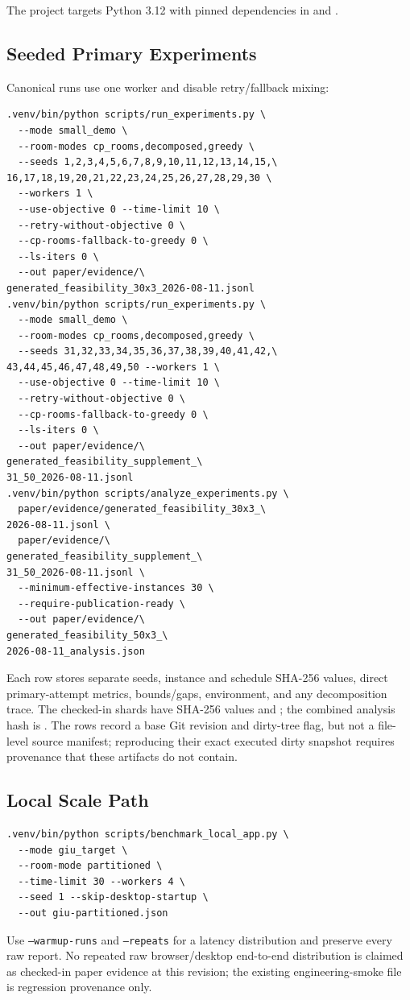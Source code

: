 The project targets Python 3.12 with pinned dependencies in  and .

\subsection*{Seeded Primary Experiments}
Canonical runs use one worker and disable retry/fallback mixing:
\begingroup\scriptsize
\begin{verbatim}
.venv/bin/python scripts/run_experiments.py \
  --mode small_demo \
  --room-modes cp_rooms,decomposed,greedy \
  --seeds 1,2,3,4,5,6,7,8,9,10,11,12,13,14,15,\
16,17,18,19,20,21,22,23,24,25,26,27,28,29,30 \
  --workers 1 \
  --use-objective 0 --time-limit 10 \
  --retry-without-objective 0 \
  --cp-rooms-fallback-to-greedy 0 \
  --ls-iters 0 \
  --out paper/evidence/\
generated_feasibility_30x3_2026-08-11.jsonl
.venv/bin/python scripts/run_experiments.py \
  --mode small_demo \
  --room-modes cp_rooms,decomposed,greedy \
  --seeds 31,32,33,34,35,36,37,38,39,40,41,42,\
43,44,45,46,47,48,49,50 --workers 1 \
  --use-objective 0 --time-limit 10 \
  --retry-without-objective 0 \
  --cp-rooms-fallback-to-greedy 0 \
  --ls-iters 0 \
  --out paper/evidence/\
generated_feasibility_supplement_\
31_50_2026-08-11.jsonl
.venv/bin/python scripts/analyze_experiments.py \
  paper/evidence/generated_feasibility_30x3_\
2026-08-11.jsonl \
  paper/evidence/\
generated_feasibility_supplement_\
31_50_2026-08-11.jsonl \
  --minimum-effective-instances 30 \
  --require-publication-ready \
  --out paper/evidence/\
generated_feasibility_50x3_\
2026-08-11_analysis.json
\end{verbatim}
\endgroup
Each row stores separate seeds, instance and schedule SHA-256 values, direct primary-attempt metrics, bounds/gaps, environment, and any decomposition trace.
The checked-in shards have SHA-256 values  and ; the combined analysis hash is .
The rows record a base Git revision and dirty-tree flag, but not a file-level source manifest; reproducing their exact executed dirty snapshot requires provenance that these artifacts do not contain.

\subsection*{Local Scale Path}
\begingroup\scriptsize
\begin{verbatim}
.venv/bin/python scripts/benchmark_local_app.py \
  --mode giu_target \
  --room-mode partitioned \
  --time-limit 30 --workers 4 \
  --seed 1 --skip-desktop-startup \
  --out giu-partitioned.json
\end{verbatim}
\endgroup
Use \texttt{--warmup-runs} and \texttt{--repeats} for a latency distribution and preserve every raw report.
No repeated raw browser/desktop end-to-end distribution is claimed as checked-in paper evidence at this revision; the existing engineering-smoke file is regression provenance only.

